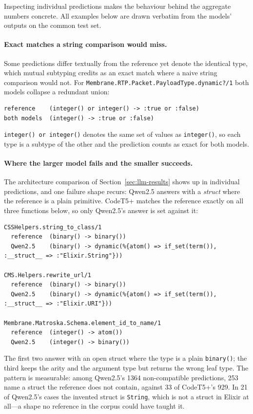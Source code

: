 Inspecting individual predictions makes the behaviour behind the aggregate numbers concrete. All examples below are drawn verbatim from the models' outputs on the common test set.

\paragraph{Exact matches a string comparison would miss.}
Some predictions differ textually from the reference yet denote the identical type, which mutual subtyping credits as an exact match where a naive string comparison would not.
For \texttt{Membrane.RTP.Packet.PayloadType.dynamic?/1} both models collapse a redundant union:

\begin{lstlisting}[numbers=none]
reference    (integer() or integer() -> :true or :false)
both models  (integer() -> :true or :false)
\end{lstlisting}

\noindent
\texttt{integer() or integer()} denotes the same set of values as \texttt{integer()}, so each type is a subtype of the other and the prediction counts as exact for both models.

\paragraph{Where the larger model fails and the smaller succeeds.}
The architecture comparison of Section~\ref{sec:llm-results} shows up in individual predictions, and one failure shape recurs: Qwen2.5 answers with a \emph{struct} where the reference is a plain primitive.
CodeT5+ matches the reference exactly on all three functions below, so only Qwen2.5's answer is set against it:

\begin{lstlisting}[numbers=none]
CSSHelpers.string_to_class/1
  reference  (binary() -> binary())
  Qwen2.5    (binary() -> dynamic(%{atom() => if_set(term()), :__struct__ => :"Elixir.String"}))

CMS.Helpers.rewrite_url/1
  reference  (binary() -> binary())
  Qwen2.5    (binary() -> dynamic(%{atom() => if_set(term()), :__struct__ => :"Elixir.URI"}))

Membrane.Matroska.Schema.element_id_to_name/1
  reference  (integer() -> atom())
  Qwen2.5    (integer() -> binary())
\end{lstlisting}

\noindent
The first two answer with an open struct where the type is a plain \texttt{binary()}; the third keeps the arity and the argument type but returns the wrong leaf type.
The pattern is measurable: among Qwen2.5's \num{1364} non-compatible predictions, \num{253} name a struct the reference does not contain, against \num{33} of CodeT5+'s \num{929}.
In \num{21} of Qwen2.5's cases the invented struct is \texttt{String}, which is not a struct in Elixir at all---a shape no reference in the corpus could have taught it.

